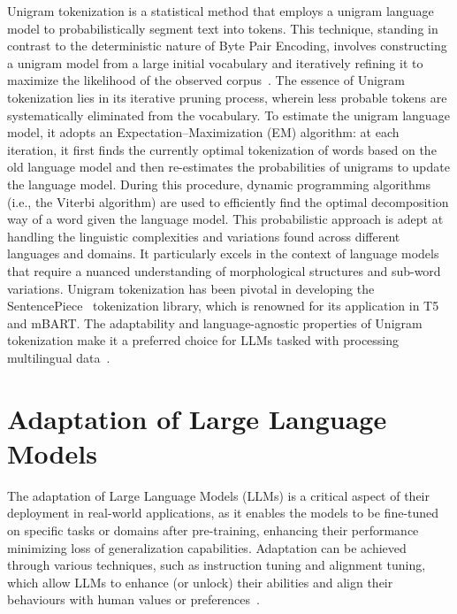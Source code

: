 Unigram tokenization is a statistical method that employs a unigram language model to probabilistically segment text into tokens.
This technique, standing in contrast to the deterministic nature of Byte Pair Encoding, involves constructing a unigram model from a large initial vocabulary and iteratively refining it to maximize the likelihood of the observed corpus~\cite{kudo2018sentencepiece}.
The essence of Unigram tokenization lies in its iterative pruning process, wherein less probable tokens are systematically eliminated from the vocabulary.
To estimate the unigram language model, it adopts an Expectation–Maximization (EM) algorithm: at each iteration, it first finds the currently optimal tokenization of words based on the old language model and then re-estimates the probabilities of unigrams to update the language model.
During this procedure, dynamic programming algorithms (i.e., the Viterbi algorithm) are used to efficiently find the optimal decomposition way of a word given the language model\cite{survey}.
This probabilistic approach is adept at handling the linguistic complexities and variations found across different languages and domains.
It particularly excels in the context of language models that require a nuanced understanding of morphological structures and sub-word variations.
Unigram tokenization has been pivotal in developing the SentencePiece~\cite{kudo2018sentencepiece} tokenization library, which is renowned for its application in T5 and mBART\@.
The adaptability and language-agnostic properties of Unigram tokenization make it a preferred choice for LLMs tasked with processing multilingual data~\cite{kudo2018sentencepiece}.

\section{Adaptation of Large Language Models}
\label{sec:adaptation-of-llms}

The adaptation of Large Language Models (LLMs) is a critical aspect of their deployment in real-world applications, as it enables the models to be fine-tuned on specific tasks or domains after pre-training, enhancing their performance minimizing loss of  generalization capabilities.
Adaptation can be achieved through various techniques, such as instruction tuning and alignment tuning, which allow LLMs to enhance (or unlock) their abilities and align their behaviours with human values or preferences~\cite{survey}.

